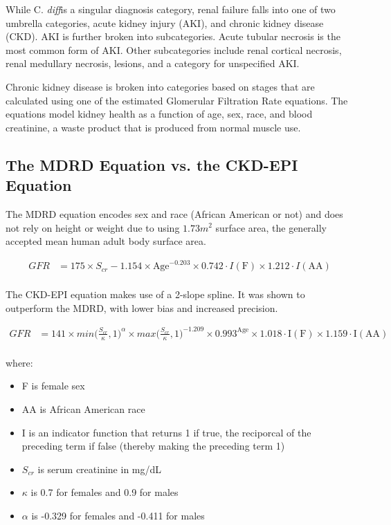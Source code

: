 \documentclass[12pt]{ociamthesis}\usepackage[]{graphicx}\usepackage[]{color}
\newcommand{\cdiff}{C. \textit{diff}}
\begin{document}
While \cdiff is a singular diagnosis category, renal failure falls into one of two umbrella categories, acute kidney injury (AKI), 
and chronic kidney disease (CKD). AKI is further broken into subcategories. Acute tubular necrosis is the most common form of AKI.
Other subcategories include renal cortical necrosis, renal medullary necrosis, lesions, and a category for unspecified AKI. 

Chronic kidney disease is broken into categories based on stages that are calculated using one of the estimated Glomerular Filtration Rate
equations. The equations model kidney health as a function of age, sex, race, and blood creatinine, a waste product that is produced from
normal muscle use. 

\subsection{The MDRD Equation vs. the CKD-EPI Equation}

The MDRD equation encodes sex and race (African American or not) and does not rely on height or weight due to using $1.73m^2$ surface area,
the generally accepted mean human adult body surface area. 

\begin{equation*}
\begin{split}
  GFR  &= 175 \times S_{cr} - 1.154 \times \text{Age}^{-0.203} \times 0.742 \cdot I(\text{F}) \times 1.212 \cdot I(\text{AA}) \\
\end{split}
\end{equation*}

The CKD-EPI equation makes use of a 2-slope spline. It was shown to outperform the MDRD, with lower bias and increased precision.  \cite{Levey2009}

\begin{equation*}
\begin{split}
  GFR &= 141 \times min\bigg(\frac{S_{cr}}{\kappa}, 1\bigg)^{\alpha} \times max\bigg(\frac{S_{cr}}{\kappa}, 1\bigg)^{-1.209} 
  \times 0.993^{\text{Age}} \times 1.018 \cdot \text{I}(\text{F}) \times 1.159 \cdot \text{I}(\text{AA}) \\
\end{split}
\end{equation*}

where:
\begin{itemize}
  \item F is female sex
  \item AA is African American race
  \item I is an indicator function that returns 1 if true, the reciporcal of the preceding term if false (thereby making the preceding term 1)
  \item $S_{cr}$ is serum creatinine in mg/dL
  \item $\kappa$ is 0.7 for females and 0.9 for males
  \item $\alpha$ is -0.329 for females and -0.411 for males
\end{itemize}
\cite{eGFR2018} 
\end{document}
